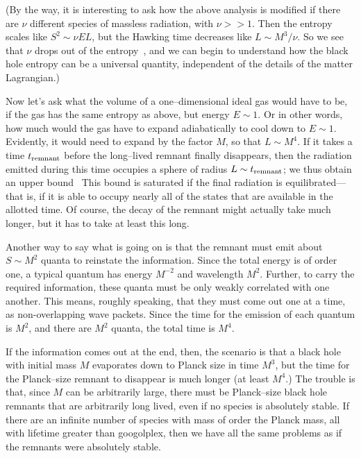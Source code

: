 (By the way, it is interesting to ask how the above analysis is modified if
there are $\nu$ different species of massless radiation, with $\nu>>1$.  Then
the entropy scales like $S^2\sim \nu EL$, but the Hawking time decreases like
$L\sim M^3/\nu$.  So  we see that $\nu$ drops out of the entropy\lref{}~, and we can
begin to understand how the black hole entropy can be a universal quantity,
independent of the details of the matter Lagrangian.)

Now let's ask what the volume of a one--dimensional ideal gas would have to be,
if the gas has the same entropy as above, but energy $E\sim 1$.  Or in other
words, how much would the gas have to expand adiabatically to cool down to
$E\sim 1$.  Evidently, it would need to expand by the factor $M$, so that
$L\sim M^4$.  If it takes a time $t_{\rm remnant}$ before the long--lived
remnant finally disappears, then the radiation emitted during this time
occupies a sphere of radius $L\sim t_{\rm remnant}$; we thus
obtain an upper bound\carlitz\
\eqn{}
This bound is saturated if the final radiation is equilibrated---that is, if it
is able to occupy nearly all of the states that are available in the allotted
time.  Of course, the decay of the remnant might actually take much longer,
but it has to take at least this long.

Another way to say what is going on is that the remnant must emit about $S\sim
M^2$ quanta to reinstate the information.  Since the total energy is of order
one, a typical quantum has energy $M^{-2}$ and wavelength $M^2$.  Further, to
carry the required information, these quanta must be only weakly correlated
with one another.  This means, roughly speaking, that they must come out one at
a time, as non-overlapping wave packets.  Since the time for the emission of
each quantum is $M^2$, and there are $M^2$ quanta, the total time is $M^4$.

If the information comes out at the end, then, the scenario is that a black
hole with initial mass $M$ evaporates down to Planck size in time $M^3$, but
the time for the Planck--size remnant to disappear is much longer (at least
$M^4$.)  The trouble is that, since $M$ can be arbitrarily large, there must be
Planck--size black hole remnants that are arbitrarily long lived, even if no
species is absolutely stable.  If there are an infinite number of species with
mass of order the Planck mass, all with lifetime greater than googolplex, then
we have all the same problems as if the remnants were absolutely stable.


